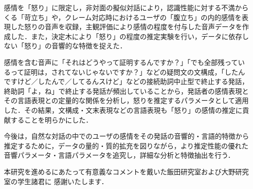 \documentclass[japanese]{jnlp_1.3c}
\begin{document}
感情を「怒り」に限定し，非対面の擬似対話により，認識性能に対する不満からくる「苛立ち」や，クレーム対応時におけるユーザの「腹立ち」の内的感情を表現した怒りの音声を収録，主観評価により感情の程度を付与した音声データを作成した．また，決定木により「怒り」の程度の推定実験を行い，データに依存しない「怒り」の音響的な特徴を捉えた．

感情を含む音声に「それはどうやって証明するんですか？」「でも全部残っているって証明は，されてないじゃないですか？」などの疑問文の文構成，「したんですけど／したんで／してるんスけど」などの接続助詞中止型で終止する発話，終助詞「よ，ね」で終止する発話が頻出していることから，発話者の感情表現とその言語表現との定量的な関係を分析し，怒りを推定するパラメータとして適用した．その結果，文構成・文末表現などの言語表現も「怒り」の感情の推定に貢献することを明らかにした．

今後は，自然な対話の中でのユーザの感情をその発話の音響的・言語的特徴から推定するために，データの量的・質的拡充を図りながら，より推定性能の優れた音響パラメータ・言語パラメータを追究し，詳細な分析と特徴抽出を行う．

\acknowledgment

本研究を進めるにあたって有意義なコメントを戴いた飯田研究室および大野研究室の学生諸君に
感謝いたします．
\end{document}
